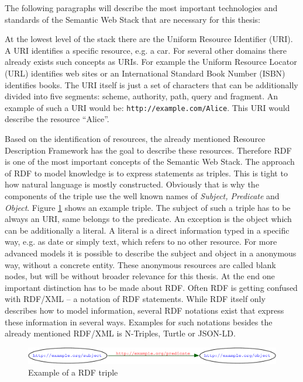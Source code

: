 The following paragraphs will describe the most important technologies and standards of the Semantic Web Stack that are necessary for this thesis:

At the lowest level of the stack there are the Uniform Resource Identifier (URI).
A URI identifies a specific resource, e.g. a car.
For several other domains there already exists such concepts as URIs.
For example the Uniform Resource Locator (URL) identifies web sites or an International Standard Book Number (ISBN) identifies books.
The URI itself is just a set of characters that can be additionally divided into five segments: scheme, authority, path, query and fragment.
An example of such a URI would be: \texttt{http://example.com/Alice}.
This URI would describe the resource ``Alice''.

Based on the identification of resources, the already mentioned Resource Description Framework has the goal to describe these resources.
Therefore RDF is one of the most important concepts of the Semantic Web Stack.
The approach of RDF to model knowledge is to express statements as triples.
This is tight to how natural language is mostly constructed.
Obviously that is why the components of the triple use the well known names of \textit{Subject, Predicate} and \textit{Object}.
Figure \ref{fig:sem_rdf} shows an example triple.
The subject of such a triple has to be always an URI, same belongs to the predicate.
An exception is the object which can be additionally a literal.
A literal is a direct information typed in a specific way, e.g. as date or simply text, which refers to no other resource.
For more advanced models it is possible to describe the subject and object in a anonymous way, without a concrete entity.
These anonymous resources are called blank nodes, but will be without broader relevance for this thesis.
At the end one important distinction has to be made about RDF.
Often RDF is getting confused with RDF/XML -- a notation of RDF statements.
While RDF itself only describes how to model information, several RDF notations exist that express these information in several ways.
Examples for such notations besides the already mentioned RDF/XML is N-Triples, Turtle or JSON-LD.

\begin{figure}
  \centering
  \includegraphics[width=\textwidth]{preliminaries/semweb_rdf1}
  \caption{Example of a RDF triple}
  \label{fig:sem_rdf}
\end{figure}

